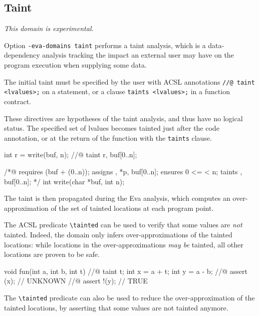 \documentclass{frama-c-book}
\begin{document}
\subsection{Taint}
\label{sec:taint}

\emph{This domain is experimental.}

Option \texttt{-eva-domains taint} performs a taint analysis, which is a
data-dependency analysis tracking the impact an external user may have on
the program execution when supplying some data.

The initial taint must be specified by the user with ACSL annotations
\lstinline|//@ taint <lvalues>;| on a statement, or a clause
\lstinline|taints <lvalues>;| in a function contract.

These directives are hypotheses of the taint analysis, and thus have no logical
status. The specified set of lvalues becomes tainted just after the code
annotation, or at the return of the function with the \texttt{taints} clause.

\begin{listing-nonumber}
  int r = write(buf, n);
  //@ taint r, buf[0..n];
\end{listing-nonumber}

\begin{listing-nonumber}
  /*@ requires \valid(buf + (0..n));
      assigns \result, *p, buf[0..n];
      ensures 0 <= \result < n;
      taints \result, buf[0..n]; */
      int write(char *buf, int n);
\end{listing-nonumber}

The taint is then propagated during the Eva analysis, which computes an
over-approximation of the set of tainted locations at each program point.

The ACSL predicate \lstinline|\tainted| can be used to verify that some
values are \emph{not} tainted.
Indeed, the domain only infers over-approximations of the tainted locations:
while locations in the over-approximations \emph{may be} tainted,
all other locations are proven to be safe.

\begin{listing-nonumber}
  void fun(int a, int b, int t) {
    //@ taint t;
    int x = a + t;
    int y = a - b;
    //@ assert \tainted(x);   // UNKNOWN
    //@ assert !\tainted(y);  // TRUE
  }
\end{listing-nonumber}

The \lstinline|\tainted| predicate can also be used to reduce the
over-approximation of the tainted locations, by asserting that some values are
not tainted anymore.
\end{document}
